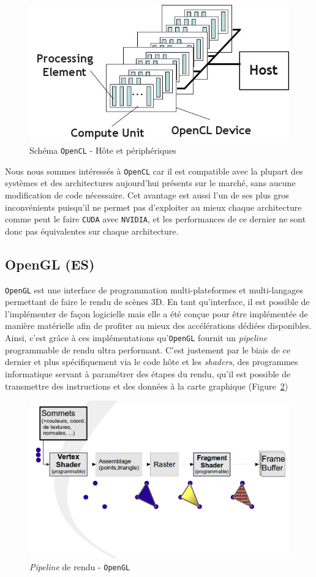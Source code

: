 \begin{figure}[H]
\centering
\includegraphics[width=0.5\linewidth]{images/opencl}
\caption{Schéma \texttt{OpenCL} - Hôte et périphériques\protect\footnotemark}
\label{fig:opencl}
\end{figure}


Nous nous sommes intéressés à \texttt{OpenCL} car il est compatible avec la plupart des systèmes et des architectures aujourd'hui présents sur le marché, sans aucune modification de code nécessaire. Cet avantage est aussi l'un de ses plus gros inconvénients puisqu'il ne permet pas d'exploiter au mieux chaque architecture comme peut le faire \texttt{CUDA} avec \texttt{NVIDIA}, et les performances de ce dernier ne sont donc pas équivalentes sur chaque architecture. %

\subsection{OpenGL (ES)}
\texttt{OpenGL} est une interface de programmation multi-plateformes et multi-langages permettant de faire le rendu de scènes 3D. En tant qu'interface, il est possible de l'implémenter de façon logicielle mais elle a été conçue pour être implémentée de manière matérielle afin de profiter au mieux des accélérations dédiées disponibles. Ainsi, c'est grâce à ces implémentations qu'\texttt{OpenGL} fournit un \emph{pipeline} programmable de rendu ultra performant. C'est justement par le biais de ce dernier et plus spécifiquement via le code hôte et les \emph{shaders}, des programmes informatique servant à paramétrer des étapes du rendu, qu'il est possible de transmettre des instructions et des données à la carte graphique (Figure~\ref{fig:opengl:pipeline})

\begin{figure}[H]
\centering
\includegraphics[width=0.7\linewidth]{images/opengl-pipeline}
\caption{\emph{Pipeline} de rendu - \texttt{OpenGL}\protect\footnotemark}
\label{fig:opengl:pipeline}
\end{figure}

